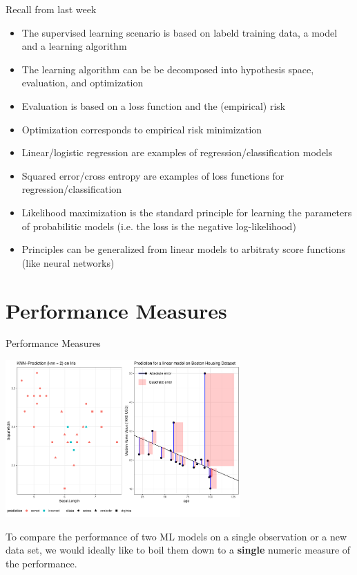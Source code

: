 









\begin{frame}{Recall from last week}
\begin{itemize}
\item The supervised learning scenario is based on labeld training data, a model and a learning algorithm
\item The learning algorithm can be be decomposed into hypothesis space, evaluation, and optimization
\item Evaluation is based on a loss function and  the (empirical) risk
\item Optimization corresponds to empirical risk minimization
\item Linear/logistic regression are examples of regression/classification models 
\item Squared error/cross entropy are examples of loss functions for regression/classification 
\item Likelihood maximization is the standard principle for learning the parameters of probabilitic models (i.e. the loss is the negative log-likelihood)
\item Principles can be generalized from linear models to arbitraty score functions (like neural networks)
\end{itemize}
\end{frame}


\section{Performance Measures}

\begin{frame}{Performance Measures}
\begin{centering}
\includegraphics[width=9cm,page=1]{plots/make_classif_regr_error_intro_plot.pdf}
\end{centering}

To compare the performance of two ML models on a single observation or a
new data set, we would ideally like to boil them down to a
\textbf{single} numeric measure of the performance.
\end{frame}


